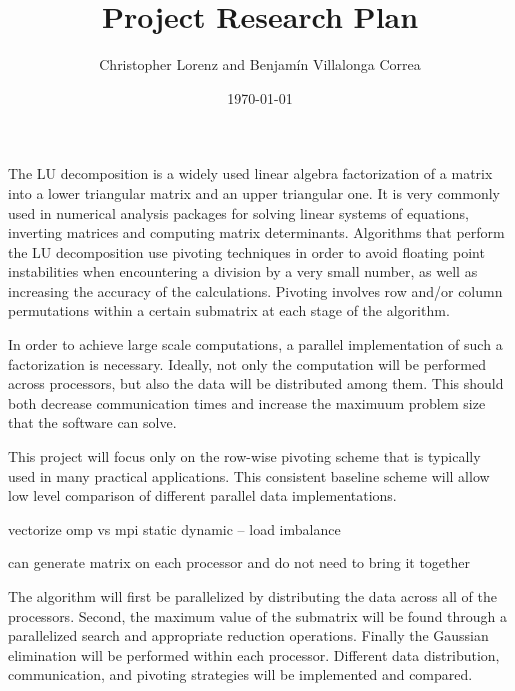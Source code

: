 \documentclass[onecolumn]{article}
\date{\today}
\begin{document}
\author{Christopher Lorenz and Benjam\'in Villalonga Correa}
\title{Project Research Plan}
\maketitle

The LU decomposition is a widely used linear algebra factorization of a matrix into a lower triangular matrix and an upper triangular one. It is very commonly used in numerical analysis packages for solving linear systems of equations, inverting matrices and computing matrix determinants. Algorithms that perform the LU decomposition use pivoting techniques in order to avoid floating point instabilities when encountering a division by a very small number, as well as increasing the accuracy of the calculations. Pivoting involves row and/or column permutations within a certain submatrix at each stage of the algorithm.

In order to achieve large scale computations, a parallel implementation of such a factorization is necessary. Ideally, not only the computation will be performed across processors, but also the data will be distributed among them. This should both decrease communication times and increase the maximuum problem size that the software can solve.

This project will focus only on the row-wise pivoting scheme that is typically used in many practical applications. This consistent baseline scheme will allow low level comparison of different parallel data implementations.


vectorize
omp vs mpi
static dynamic -- load imbalance

can generate matrix on each processor and do not need to bring it together 

The algorithm will first be parallelized by distributing the data across all of the processors. Second, the maximum value of the submatrix will be found through a parallelized search and appropriate reduction operations. Finally the Gaussian elimination will be performed within each processor. Different data distribution, communication, and pivoting strategies will be implemented and compared.
\end{document}
